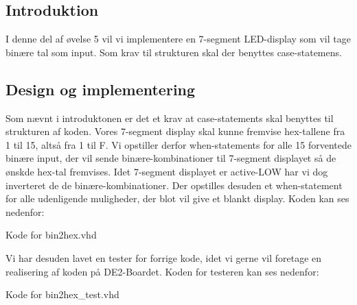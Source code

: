 \documentclass[../journal.tex]{subfiles}
\begin{document}
\subsection{Introduktion}
I denne del af øvelse 5 vil vi implementere en 7-segment LED-display som vil tage binære tal som input. Som krav til strukturen skal der benyttes case-statemens.

\subsection{Design og implementering}
Som nævnt i introduktonen er det et krav at case-statements skal benyttes til strukturen af koden. Vores 7-segment display skal kunne fremvise hex-tallene fra 1 til 15, altså fra 1 til F. Vi opstiller derfor when-statements for alle 15 forventede binære input, der vil sende binære-kombinationer til 7-segment displayet så de ønskde hex-tal fremvises. Idet 7-segment displayet er active-LOW har vi dog inverteret de de binære-kombinationer. Der opstilles desuden et when-statement for alle udenligende muligheder, der blot vil give et blankt display. Koden kan ses nedenfor:

\begin{table}[H]
    \centering
      \framebox{
        \rule{8pt}{0pt}
          
  }
  \caption{Kode for bin2hex.vhd}	
  \label{src:TabCon}
\end{table}

Vi har desuden lavet en tester for forrige kode, idet vi gerne vil foretage en realisering af koden på DE2-Boardet. Koden for testeren kan ses nedenfor:

\begin{table}[H]
    \centering
      \framebox{
        \rule{8pt}{0pt}
          
  }
  \caption{Kode for bin2hex\_test.vhd}	
  \label{src:TabConTest}
\end{table}

%          

%            
\end{document}
